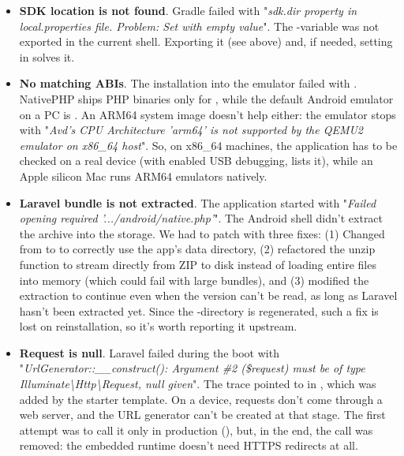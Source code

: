 \begin{itemize}
  \item \textbf{SDK location is not found}. Gradle failed with "\emph{sdk.dir property in
  local.properties file. Problem: Set with empty value}". The -variable was not
  exported in the current shell. Exporting it (see above) and, if needed, setting
   in  solves it.

  \item \textbf{No matching ABIs}. The installation into the emulator failed with
  . NativePHP ships PHP binaries only for ,
  while the default Android emulator on a PC is . An ARM64 system image doesn't help
  either: the emulator stops with "\emph{Avd's CPU Architecture 'arm64' is not supported by the
  QEMU2 emulator on x86\_64 host}". So, on x86\_64 machines, the application has to be checked
  on a real device (with enabled USB debugging,  lists it), while an Apple
  silicon Mac runs ARM64 emulators natively.

  \item \textbf{Laravel bundle is not extracted}. The application started with "\emph{Failed
  opening required '.../android/native.php'}". The Android shell didn't extract the archive into
  the storage. We had to patch  with three fixes:
  (1) Changed from  to  to correctly use the app's data directory, (2) refactored the unzip
  function to stream directly from ZIP to disk instead of loading entire files into memory
  (which could fail with large bundles), and (3) modified the extraction
  to continue even when the version can't be read, as long as Laravel hasn't been extracted yet.
  Since the -directory is regenerated, such a fix is lost on reinstallation, so
  it's worth reporting it upstream.

  \item \textbf{Request is null}. Laravel failed during the boot with
  "\emph{UrlGenerator::\_\_construct(): Argument \#2 (\$request) must be of type
  Illuminate\textbackslash Http\textbackslash Request, null given}". The trace pointed to
   in , which was added by the starter
  template.  On a device, requests don't come through a web server, and the URL generator can't
  be created at that stage. The first attempt was to call it only in production
  (), but, in the end, the call was removed: the embedded
  runtime doesn't need HTTPS redirects at all.


\end{itemize}
